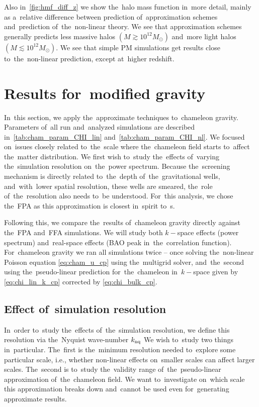 Also in~\autoref{fig:hmf_diff_z} we show the~halo mass function in~more detail, mainly as a~relative difference between prediction of~approximation schemes and~prediction of~the~non-linear theory. We see that approximation schemes generally predicts less massive halos $(M\gtrsim10^{12}M_\odot)$ and~more light halos $(M\lesssim10^{12}M_\odot)$. We see that simple PM simulations get results close to~the~non-linear prediction, except at~higher redshift. 
\section{Results for~modified gravity}
\newcommand{\chileft}{\hspace*{-1cm}}
In~this section, we apply the~approximate techniques to~chameleon gravity. Parameters of~all run and~analyzed simulations are described in~\autoref{tab:cham_param_CHI_lin} and~\autoref{tab:cham_param_CHI_nl}. We focused on~issues closely related to~the~scale where the~chameleon field starts to~affect the~matter distribution. We first wish to~study the~effects of~varying the~simulation resolution on~the~power spectrum. Because the~screening mechanism is directly related to~the~depth of~the~gravitational wells, and~with~lower spatial resolution, these wells are smeared, the~role of~the~resolution also needs to~be understood. For~this analysis, we chose the~FPA as this approximation is closest in~spirit to~\nbodysim s.

Following this, we compare the~results of~chameleon gravity directly against the~FPA and~FFA simulations. 
We will study both $k-$space effects (power spectrum) and~real-space effects (BAO peak in~the~correlation function). For~chameleon gravity we ran all simulations twice -- once solving the~non-linear Poisson equation \eqref{eq:cham_u_cp} using the~multigrid solver, and~the~second using the~pseudo-linear prediction for~the~chameleon in~$k-$space given by \eqref{eq:chi_lin_k_cp} corrected by \eqref{eq:chi_bulk_cp}.

\subsection{Effect of~simulation resolution}
In~order to~study the~effects of~the~simulation resolution, we define this resolution via the~Nyquist wave-number $k_{\rm nq}$
We wish to~study two things in~particular. The~first is the~minimum resolution needed to~explore some particular scale, i.e., whether non-linear effects on~smaller scales can affect larger scales. The~second is to~study the~validity range of~the~pseudo-linear approximation of~the~chameleon field. We want to~investigate on~which scale this approximation breaks down and~cannot be used even for~generating approximate results.

